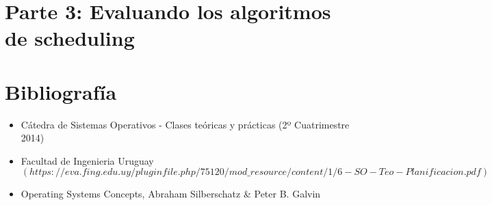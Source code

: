 \documentclass[a4paper,10pt,twoside]{article}
\begin{document}
\section{Parte 3: Evaluando los algoritmos de scheduling}


\newpage



\newpage
\section{Bibliografía}

\begin{itemize}
 \item Cátedra de Sistemas Operativos - Clases teóricas y prácticas (2º Cuatrimestre 2014)
 \item Facultad de Ingenieria Uruguay \\
 $(https://eva.fing.edu.uy/pluginfile.php/75120/mod\_resource/content/1/6-SO-Teo-Planificacion.pdf)$
 \item Operating Systems Concepts, Abraham Silberschatz \& Peter B. Galvin
\end{itemize}
\end{document}
